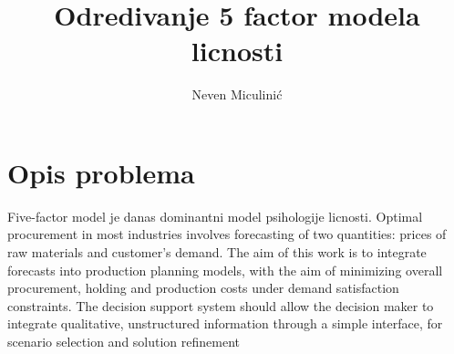 \documentclass[times, utf8, seminar]{fer}
\begin{document}
\theoremstyle{definition}
\newtheorem{definition}{Definition}[section]

\title{Odredivanje 5 factor modela licnosti}
\author{Neven Miculinić}

\maketitle

\chapter*{Opis problema}

Five-factor model je danas dominantni model psihologije licnosti.
Optimal procurement in most industries involves forecasting of two
quantities: prices of raw materials and customer's demand.  The aim of
this work is to integrate forecasts into production planning models,
with the aim of minimizing overall procurement, holding and production
costs under demand satisfaction constraints.  The decision support
system should allow the decision maker to integrate qualitative,
unstructured information through a simple interface, for scenario
selection and solution refinement

\tableofcontents
\end{document}
